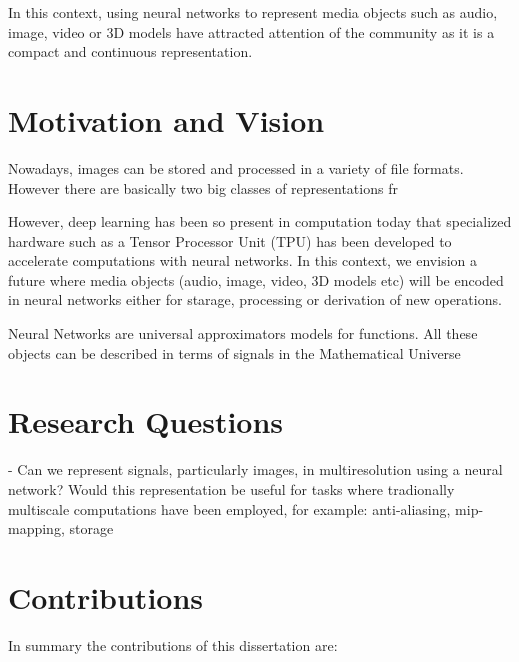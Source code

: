 In this context, using neural networks to represent media objects such as audio, image, video or 3D models have attracted attention of the community as it is a compact and continuous representation. 


\section{Motivation and Vision}

Nowadays, images can be stored and processed in a variety of file formats. However there are basically two big classes of representations fr

However, deep learning has been so present in computation today that specialized hardware such as a Tensor Processor Unit (TPU) has been developed to accelerate computations with neural networks. In this context, we envision a future where media objects (audio, image, video, 3D models etc) will be encoded in neural networks either for starage, processing or derivation of new operations. 

Neural Networks are universal approximators models for functions. All these objects can be described in terms of signals in the Mathematical Universe


\section{Research Questions}

- Can we represent signals, particularly images, in multiresolution using a neural network? Would this representation be useful for tasks  where tradionally multiscale computations have been employed, for example: anti-aliasing, mip-mapping, storage

\section{Contributions}

In summary the contributions of this dissertation are:

